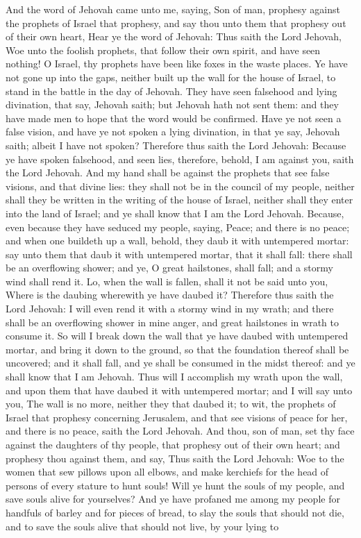 And the word of Jehovah came unto me, saying, Son of man, prophesy against the prophets of Israel that prophesy, and say thou unto them that prophesy out of their own heart, Hear ye the word of Jehovah: Thus saith the Lord Jehovah, Woe unto the foolish prophets, that follow their own spirit, and have seen nothing! O Israel, thy prophets have been like foxes in the waste places. Ye have not gone up into the gaps, neither built up the wall for the house of Israel, to stand in the battle in the day of Jehovah. They have seen falsehood and lying divination, that say, Jehovah saith; but Jehovah hath not sent them: and they have made men to hope that the word would be confirmed. Have ye not seen a false vision, and have ye not spoken a lying divination, in that ye say, Jehovah saith; albeit I have not spoken?  Therefore thus saith the Lord Jehovah: Because ye have spoken falsehood, and seen lies, therefore, behold, I am against you, saith the Lord Jehovah. And my hand shall be against the prophets that see false visions, and that divine lies: they shall not be in the council of my people, neither shall they be written in the writing of the house of Israel, neither shall they enter into the land of Israel; and ye shall know that I am the Lord Jehovah. Because, even because they have seduced my people, saying, Peace; and there is no peace; and when one buildeth up a wall, behold, they daub it with untempered mortar: say unto them that daub it with untempered mortar, that it shall fall: there shall be an overflowing shower; and ye, O great hailstones, shall fall; and a stormy wind shall rend it. Lo, when the wall is fallen, shall it not be said unto you, Where is the daubing wherewith ye have daubed it? Therefore thus saith the Lord Jehovah: I will even rend it with a stormy wind in my wrath; and there shall be an overflowing shower in mine anger, and great hailstones in wrath to consume it. So will I break down the wall that ye have daubed with untempered mortar, and bring it down to the ground, so that the foundation thereof shall be uncovered; and it shall fall, and ye shall be consumed in the midst thereof: and ye shall know that I am Jehovah. Thus will I accomplish my wrath upon the wall, and upon them that have daubed it with untempered mortar; and I will say unto you, The wall is no more, neither they that daubed it; to wit, the prophets of Israel that prophesy concerning Jerusalem, and that see visions of peace for her, and there is no peace, saith the Lord Jehovah.  And thou, son of man, set thy face against the daughters of thy people, that prophesy out of their own heart; and prophesy thou against them, and say, Thus saith the Lord Jehovah: Woe to the women that sew pillows upon all elbows, and make kerchiefs for the head of persons of every stature to hunt souls! Will ye hunt the souls of my people, and save souls alive for yourselves? And ye have profaned me among my people for handfuls of barley and for pieces of bread, to slay the souls that should not die, and to save the souls alive that should not live, by your lying to 